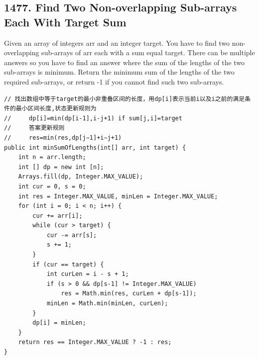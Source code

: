 \documentclass[9pt, b5paper]{article}
\begin{document}
\subsection{1477. Find Two Non-overlapping Sub-arrays Each With Target Sum}
\label{sec-4-36}
Given an array of integers arr and an integer target.
You have to find two non-overlapping sub-arrays of arr each with a sum equal target. There can be multiple answers so you have to find an answer where the sum of the lengths of the two sub-arrays is minimum.
Return the minimum sum of the lengths of the two required sub-arrays, or return -1 if you cannot find such two sub-arrays.
\begin{verbatim}
// 找出数组中等于target的最小非重叠区间的长度，用dp[i]表示当前i以及i之前的满足条件的最小区间长度,状态更新规则为
//     dp[i]=min(dp[i-1],i-j+1) if sum[j,i]=target
//     答案更新规则
//     res=min(res,dp[j−1]+i−j+1)
public int minSumOfLengths(int[] arr, int target) {
    int n = arr.length;
    int [] dp = new int [n];
    Arrays.fill(dp, Integer.MAX_VALUE);
    int cur = 0, s = 0;
    int res = Integer.MAX_VALUE, minLen = Integer.MAX_VALUE;
    for (int i = 0; i < n; i++) {
        cur += arr[i];
        while (cur > target) {
            cur -= arr[s];
            s += 1;
        }
        if (cur == target) {
            int curLen = i - s + 1;
            if (s > 0 && dp[s-1] != Integer.MAX_VALUE) 
                res = Math.min(res, curLen + dp[s-1]);
            minLen = Math.min(minLen, curLen);
        }
        dp[i] = minLen;
    }
    return res == Integer.MAX_VALUE ? -1 : res;
}
\end{verbatim}
\end{document}

